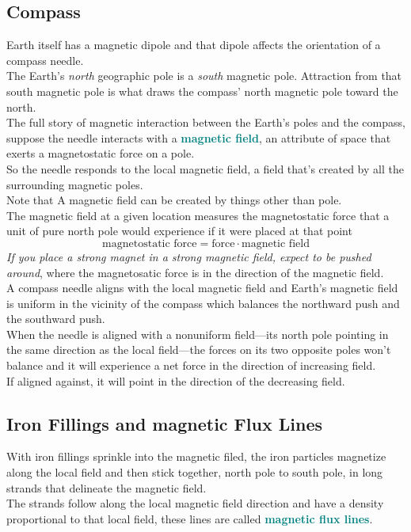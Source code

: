 \documentclass[12pt]{article}
\theoremstyle{definition}
\newcommand{\defnterm}[1]{\textbf{\textcolor{teal}{#1}}\index{#1}}
\begin{document}
\subsection{Compass}
Earth itself has a magnetic dipole and that dipole affects the orientation of a compass needle. \\
The Earth's \emph{north} geographic pole is a \emph{south} magnetic pole.
Attraction from that south magnetic pole is what draws the compass' north magnetic pole toward the north. \\

The full story of magnetic interaction between the Earth's poles and the compass, suppose the needle interacts with a \defnterm{magnetic field}, an attribute of space that exerts a magnetostatic force on a pole. \\
So the needle responds to the local magnetic field, a field that's created by all the surrounding magnetic poles. \\
Note that A magnetic field can be created by things other than pole. \\
The magnetic field at a given location measures the magnetostatic force that a unit of pure north pole would experience if it were placed at that point
$$\text{magnetostatic force} = \text{force} \cdot \text{magnetic field}$$
\emph{If you place a strong magnet in a strong magnetic field, expect to be pushed around}, where the magnetosatic force is in the direction of the magnetic field. \\

A compass needle aligns with the local magnetic field and Earth's magnetic field is uniform in the vicinity of the compass which balances the northward push and the southward push. \\
When the needle is aligned with a nonuniform field---its north pole pointing in the same direction as the local field---the forces on its two opposite poles won't balance and it will experience a net force in the direction of increasing field. \\
If aligned against, it will point in the direction of the decreasing field.

\subsection{Iron Fillings and magnetic Flux Lines}
With iron fillings sprinkle into the magnetic filed, the iron particles magnetize along the local field and then stick together, north pole to south pole, in long strands that delineate the magnetic field. \\
The strands follow along the local magnetic field direction and have a density proportional to that local field, these lines are called \defnterm{magnetic flux lines}. \\
\end{document}
